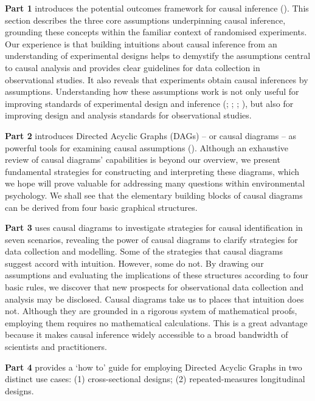 \documentclass[
  singlecolumn]{article}
\begin{document}
\textbf{Part 1} introduces the potential outcomes framework for causal
inference (). This
section describes the three core assumptions underpinning causal
inference, grounding these concepts within the familiar context of
randomised experiments. Our experience is that building intuitions about
causal inference from an understanding of experimental designs helps to
demystify the assumptions central to causal analysis and provides clear
guidelines for data collection in observational studies. It also reveals
that experiments obtain causal inferences by assumptions. Understanding
how these assumptions work is not only useful for improving standards of
experimental design and inference (; ; ;
), but also
for improving design and analysis standards for observational studies.

\textbf{Part 2} introduces Directed Acyclic Graphs (DAGs) -- or causal
diagrams -- as powerful tools for examining causal assumptions
(). Although an exhaustive review
of causal diagrams' capabilities is beyond our overview, we present
fundamental strategies for constructing and interpreting these diagrams,
which we hope will prove valuable for addressing many questions within
environmental psychology. We shall see that the elementary building
blocks of causal diagrams can be derived from four basic graphical
structures.

\textbf{Part 3} uses causal diagrams to investigate strategies for
causal identification in seven scenarios, revealing the power of causal
diagrams to clarify strategies for data collection and modelling. Some
of the strategies that causal diagrams suggest accord with intuition.
However, some do not. By drawing our assumptions and evaluating the
implications of these structures according to four basic rules, we
discover that new prospects for observational data collection and
analysis may be disclosed. Causal diagrams take us to places that
intuition does not. Although they are grounded in a rigorous system of
mathematical proofs, employing them requires no mathematical
calculations. This is a great advantage because it makes causal
inference widely accessible to a broad bandwidth of scientists and
practitioners.

\textbf{Part 4} provides a `how to' guide for employing Directed Acyclic
Graphs in two distinct use cases: (1) cross-sectional designs; (2)
repeated-measures longitudinal designs.
\end{document}
